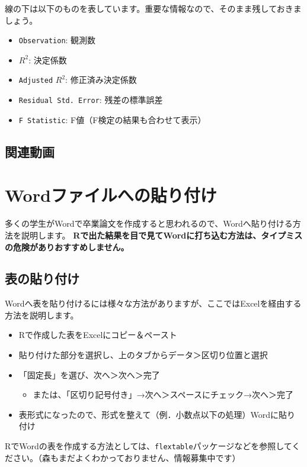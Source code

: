 \documentclass[
]{book}
\providecommand{\tightlist}{%
  \setlength{\itemsep}{0pt}\setlength{\parskip}{0pt}}
\begin{document}
線の下は以下のものを表しています。重要な情報なので、そのまま残しておきましょう。

\begin{itemize}
\tightlist
\item
  \texttt{Observation}: 観測数
\item
  \(R^2\): 決定係数
\item
  \texttt{Adjusted} \(R^2\): 修正済み決定係数
\item
  \texttt{Residual\ Std.\ Error}: 残差の標準誤差
\item
  \texttt{F\ Statistic}: F値（F検定の結果も合わせて表示）
\end{itemize}

\hypertarget{movieRegression}{%
\section{関連動画}\label{movieRegression}}

\hypertarget{Word}{%
\chapter{Wordファイルへの貼り付け}\label{Word}}

多くの学生がWordで卒業論文を作成すると思われるので、Wordへ貼り付ける方法を説明します。
\textbf{Rで出た結果を目で見てWordに打ち込む方法は、タイプミスの危険がありおすすめしません。}

\hypertarget{ux8868ux306eux8cbcux308aux4ed8ux3051}{%
\section{表の貼り付け}\label{ux8868ux306eux8cbcux308aux4ed8ux3051}}

Wordへ表を貼り付けるには様々な方法がありますが、ここではExcelを経由する方法を説明します。

\begin{itemize}
\tightlist
\item
  Rで作成した表をExcelにコピー＆ペースト
\item
  貼り付けた部分を選択し、上のタブからデータ＞区切り位置と選択
\item
  「固定長」を選び、次へ＞次へ＞完了

  \begin{itemize}
  \tightlist
  \item
    または、「区切り記号付き」→次へ＞スペースにチェック→次へ＞完了
  \end{itemize}
\item
  表形式になったので、形式を整えて（例．小数点以下の処理）Wordに貼り付け
\end{itemize}

RでWordの表を作成する方法としては、\texttt{flextable}パッケージなどを参照してください。（森もまだよくわかっておりません、情報募集中です）

  
\end{document}
